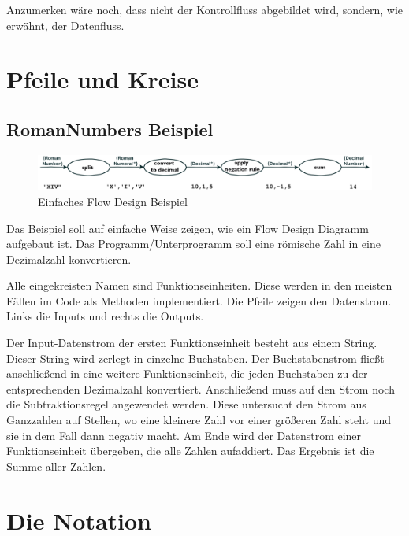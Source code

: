 Anzumerken wäre noch, dass nicht der Kontrollfluss abgebildet wird, sondern, wie erwähnt, der Datenfluss.


\chapter{Pfeile und Kreise}

\section{RomanNumbers Beispiel}

\begin{center}
\begin{figure}[!htbp]
	\includegraphics[width=1.1\linewidth]{./img/FromRomanNumerals.png}
	\caption{Einfaches Flow Design Beispiel}
\end{figure}
\end{center}




Das Beispiel soll auf einfache Weise zeigen, wie ein Flow Design Diagramm aufgebaut ist.
Das Programm/Unterprogramm soll eine römische Zahl in eine Dezimalzahl konvertieren.

Alle eingekreisten Namen sind Funktionseinheiten.
Diese werden in den meisten Fällen im Code als Methoden implementiert.
Die Pfeile zeigen den Datenstrom. Links die Inputs und rechts die Outputs.


Der Input-Datenstrom der ersten Funktionseinheit besteht aus einem String. Dieser String wird zerlegt in einzelne Buchstaben.
Der Buchstabenstrom fließt anschließend in eine weitere Funktionseinheit, die jeden Buchstaben zu der entsprechenden
Dezimalzahl konvertiert. Anschließend muss auf den Strom noch die Subtraktionsregel angewendet werden. Diese untersucht den
Strom aus Ganzzahlen auf Stellen, wo eine kleinere Zahl vor einer größeren Zahl steht und sie in dem Fall dann negativ macht.
Am Ende wird der Datenstrom einer Funktionseinheit übergeben, die alle Zahlen aufaddiert.
Das Ergebnis ist die Summe aller Zahlen.



\chapter{Die Notation}

